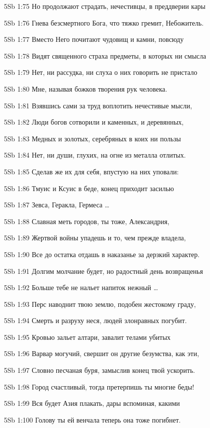 \vs 5Sb 1:75 Но продолжают страдать, нечестивцы, в преддверии кары  

\vs 5Sb 1:76 Гнева безсмертного Бога, что тяжко гремит, Небожитель. 

\vs 5Sb 1:77 Вместо Него почитают чудовищ и камни, повсюду 

\vs 5Sb 1:78 Видят священного страха предметы, в которых ни смысла 

\vs 5Sb 1:79 Нет, ни рассудка, ни слуха  о них говорить не пристало

\vs 5Sb 1:80 Мне, называя божков  творения рук человека. 

\vs 5Sb 1:81 Взявшись сами за труд воплотить нечестивые мысли, 

\vs 5Sb 1:82 Люди богов сотворили и каменных, и деревянных, 

\vs 5Sb 1:83 Медных и золотых, серебряных  в коих ни пользы 

\vs 5Sb 1:84 Нет, ни души, глухих, на огне из металла отлитых.

\vs 5Sb 1:85 Сделав же их для себя, впустую на них уповали: 

\vs 5Sb 1:86 Тмуис и Ксуис в беде, конец приходит засилью 

\vs 5Sb 1:87 Зевса, Геракла, Гермеса \ldots

\vs 5Sb 1:88 Славная меть городов, ты тоже, Александрия, 

\vs 5Sb 1:89 Жертвой войны упадешь и то, чем прежде владела,

\vs 5Sb 1:90 Все до остатка отдашь в наказанье за дерзкий характер. 

\vs 5Sb 1:91 Долгим молчание будет, но радостный день возвращенья 

\vs 5Sb 1:92 Больше тебе не нальет напиток нежный \ldots

\vs 5Sb 1:93 Перс наводнит твою землю, подобен жестокому граду, 

\vs 5Sb 1:94 Смерть и разруху неся, людей злонравных погубит.

\vs 5Sb 1:95 Кровью зальет алтари, завалит телами убитых 

\vs 5Sb 1:96 Варвар могучий, свершит он другие безумства, как эти, 

\vs 5Sb 1:97 Словно песчаная буря, замыслив конец твой ускорить. 

\vs 5Sb 1:98 Город счастливый, тогда претерпишь ты многие беды! 

\vs 5Sb 1:99 Вся будет Азия плакать, дары вспоминая, какими

\vs 5Sb 1:100 Голову ты ей венчала  теперь она тоже погибнет. 

